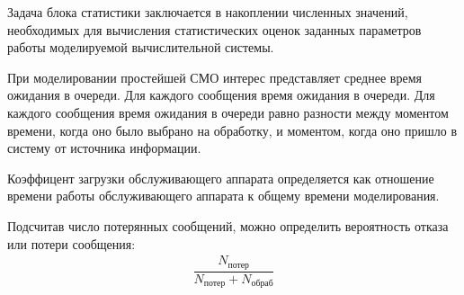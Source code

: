 Задача блока статистики заключается в накоплении численных значений, необходимых для вычисления статистических оценок заданных параметров работы моделируемой вычислительной системы.

При моделировании простейшей СМО интерес представляет среднее время ожидания в очереди. Для каждого сообщения время ожидания в очереди. Для каждого сообщения время ожидания в очереди равно разности между моментом времени, когда оно было выбрано на обработку, и моментом, когда оно пришло в систему от источника информации.

Коэффицент загрузки обслуживающего аппарата определяется как отношение времени работы обслуживающего аппарата к общему времени моделирования.

Подсчитав число потерянных сообщений, можно определить вероятность отказа или потери сообщения:
%
\begin{gather*}
    \dfrac{N_{\text{потер}}}{N_\text{потер} + N_\text{обраб}}
\end{gather*}